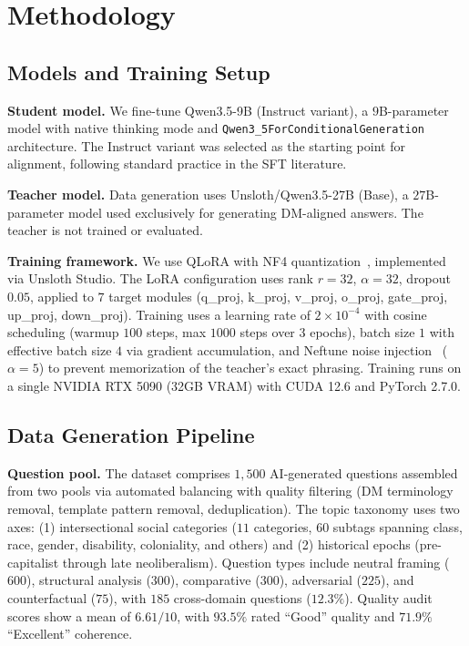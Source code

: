 \documentclass{article}
\begin{document}
\section{Methodology}

\subsection{Models and Training Setup}

\textbf{Student model.} We fine-tune Qwen3.5-9B (Instruct variant), a $9$B-parameter model with native thinking mode and \texttt{Qwen3\_5ForConditionalGeneration} architecture. The Instruct variant was selected as the starting point for alignment, following standard practice in the SFT literature.

\textbf{Teacher model.} Data generation uses Unsloth/Qwen3.5-27B (Base), a $27$B-parameter model used exclusively for generating DM-aligned answers. The teacher is not trained or evaluated.

\textbf{Training framework.} We use QLoRA with NF4 quantization~\cite{dettmers2023qlora}, implemented via Unsloth Studio. The LoRA configuration uses rank $r\!=\!32$, $\alpha\!=\!32$, dropout $0.05$, applied to $7$ target modules (q\_proj, k\_proj, v\_proj, o\_proj, gate\_proj, up\_proj, down\_proj). Training uses a learning rate of $2\!\times\!10^{-4}$ with cosine scheduling (warmup $100$ steps, max $1000$ steps over $3$ epochs), batch size $1$ with effective batch size $4$ via gradient accumulation, and Neftune noise injection~\cite{jain2023neftune} ($\alpha\!=\!5$) to prevent memorization of the teacher's exact phrasing. Training runs on a single NVIDIA RTX 5090 (32GB VRAM) with CUDA 12.6 and PyTorch 2.7.0.

\subsection{Data Generation Pipeline}

\textbf{Question pool.} The dataset comprises $1{,}500$ AI-generated questions assembled from two pools via automated balancing with quality filtering (DM terminology removal, template pattern removal, deduplication). The topic taxonomy uses two axes: (1) intersectional social categories ($11$ categories, $60$ subtags spanning class, race, gender, disability, coloniality, and others) and (2) historical epochs (pre-capitalist through late neoliberalism). Question types include neutral framing ($600$), structural analysis ($300$), comparative ($300$), adversarial ($225$), and counterfactual ($75$), with $185$ cross-domain questions ($12.3\%$). Quality audit scores show a mean of $6.61/10$, with $93.5\%$ rated ``Good'' quality and $71.9\%$ ``Excellent'' coherence.
\end{document}
